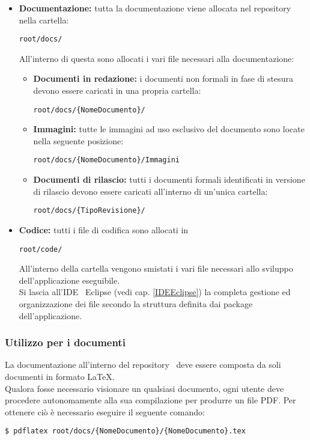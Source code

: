 {{{\begin{itemize}
				\item \textbf{Documentazione:} tutta la documentazione viene allocata nel repository\g~ nella cartella:
				\begin{center}
					\texttt{root/docs/}
				\end{center}	 
				All'interno di questa sono allocati i vari file necessari alla documentazione:
				\begin{itemize}
					\item \textbf{Documenti in redazione:} i documenti non formali in fase di stesura devono essere caricati in una propria cartella:  
					\begin{center}
						\texttt{root/docs/\{NomeDocumento\}/}
					\end{center}
					\item \textbf{Immagini:} tutte le immagini ad uso esclusivo del documento sono locate nella seguente posizione:
						\begin{center}
							\texttt{root/docs/\{NomeDocumento\}/Immagini}
						\end{center}
					
					\item \textbf{Documenti di rilascio:} tutti i documenti formali identificati in versione di rilascio devono essere caricati all'interno di un'unica cartella: 
					\begin{center}
						\texttt{root/docs/\{TipoRevisione\}/}
					\end{center}
				\end{itemize}
				
				\item \textbf{Codice:} tutti i file di codifica sono allocati in
				\begin{center}
					\texttt{root/code/}
				\end{center}	 
				All'interno della cartella vengono smistati i vari file necessari allo sviluppo dell'applicazione eseguibile.\\
Si lascia all'IDE\g~ Eclipse (vedi cap. \ref{IDEEclipse}) la completa gestione ed organizzazione dei file secondo la struttura definita dai package dell'applicazione.
			\end{itemize}
		}

		\subsubsection{Utilizzo per i documenti}{
			La documentazione all'interno del repository\g~ deve essere composta da soli documenti in formato \LaTeX.\\
			Qualora fosse necessario visionare un qualsiasi documento, ogni utente deve procedere autonomamente alla sua compilazione per produrre un file PDF\g . 
			Per ottenere ciò è necessario eseguire il seguente comando:
			\begin{center}
				\texttt{\$ pdflatex root/docs/\{NomeDocumento\}/\{NomeDocumento\}.tex}
			\end{center}
		}
	}
}